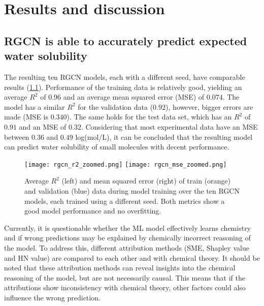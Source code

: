 \chapter{Results and discussion}

\section{RGCN is able to accurately predict expected water solubility}


The resulting ten RGCN models, each with a different seed, have comparable results 
(\cref{fig:training_history}). 
Performance of the training data is relatively good, yielding an average $R^2$ 
of $0.96$ and an average mean squared error (MSE) of $0.074$. The model has a 
similar $R^2$ for the validation data ($0.92$), however, bigger errors are made 
(MSE is $0.340$). The same holds for the test data set, which has an $R^2$ of 
$0.91$ and an MSE of $0.32$. Considering that most experimental data have an MSE 
between $0.36$ and $0.49$ log(mol/L),\cite{palmer2014experimental} 
it can be concluded that the resulting model can predict water solubility of small 
molecules with decent performance.



\begin{figure}[h]
    \centering
    \texttt{[image: rgcn\_r2\_zoomed.png]}
    \texttt{[image: rgcn\_mse\_zoomed.png]}
    \caption{Average $R^2$ (left) and mean squared error (right) of train (orange) and validation 
    (blue) data during model training over the ten RGCN models, each trained using a different 
    seed. Both metrics show a good model performance and no overfitting. }
    \label{fig:training_history}
\end{figure}


Currently, it is questionable whether the ML model effectively learns chemistry and 
if wrong predictions may be explained by chemically incorrect reasoning of the model. 
To address this, different attribution methods (SME, Shapley value and HN value) are 
compared to each other and with chemical theory. It should be noted that these attribution 
methods can reveal insights into the chemical reasoning of the model, but are not necessarily 
causal. This means that if the attributions show inconsistency with chemical theory, other 
factors could also influence the wrong prediction.


